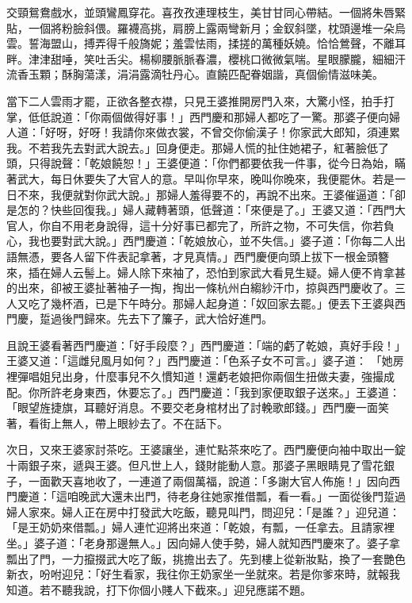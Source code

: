 \begin{showcontents}{}
交頸鴛鴦戲水，並頭鸞鳳穿花。喜孜孜連理枝生，美甘甘同心帶結。一個將朱唇緊貼，一個將粉臉斜偎。羅襪高挑，肩膀上露兩彎新月；金釵斜墜，枕頭邊堆一朵烏雲。誓海盟山，搏弄得千般旖妮；羞雲怯雨，揉搓的萬種妖嬈。恰恰鶯聲，不離耳畔。津津甜唾，笑吐舌尖。楊柳腰脈脈春濃，櫻桃口微微氣喘。星眼朦朧，細細汗流香玉顆；酥胸蕩漾，涓涓露滴牡丹心。直饒匹配眷姻諧，真個偷情滋味美。

當下二人雲雨才罷，正欲各整衣襟，只見王婆推開房門入來，大驚小怪，拍手打掌，低低說道：「你兩個做得好事！」西門慶和那婦人都吃了一驚。那婆子便向婦人道：「好呀，好呀！我請你來做衣裳，不曾交你偷漢子！你家武大郎知，須連累我。不若我先去對武大說去。」回身便走。那婦人慌的扯住她裙子，紅著臉低了頭，只得說聲：「乾娘饒恕！」王婆便道：「你們都要依我一件事，從今日為始，瞞著武大，每日休要失了大官人的意。早叫你早來，晚叫你晚來，我便罷休。若是一日不來，我便就對你武大說。」那婦人羞得要不的，再說不出來。王婆催逼道：「卻是怎的？快些回復我。」婦人藏轉著頭，低聲道：「來便是了。」王婆又道：「西門大官人，你自不用老身說得，這十分好事已都完了，所許之物，不可失信，你若負心，我也要對武大說。」西門慶道：「乾娘放心，並不失信。」婆子道：「你每二人出語無憑，要各人留下件表記拿著，才見真情。」西門慶便向頭上拔下一根金頭簪來，插在婦人云髻上。婦人除下來袖了，恐怕到家武大看見生疑。婦人便不肯拿甚的出來，卻被王婆扯著袖子一掏，掏出一條杭州白縐紗汗巾，掠與西門慶收了。三人又吃了幾杯酒，已是下午時分。那婦人起身道：「奴回家去罷。」便丟下王婆與西門慶，踅過後門歸來。先去下了簾子，武大恰好進門。

且說王婆看著西門慶道：「好手段麼？」西門慶道：「端的虧了乾娘，真好手段！」王婆又道：「這雌兒風月如何？」西門慶道：「色系子女不可言。」婆子道： 「她房裡彈唱姐兒出身，什麼事兒不久慣知道！還虧老娘把你兩個生扭做夫妻，強撮成配。你所許老身東西，休要忘了。」西門慶道：「我到家便取銀子送來。」王婆道：「眼望旌捷旗，耳聽好消息。不要交老身棺材出了討輓歌郎錢。」西門慶一面笑著，看街上無人，帶上眼紗去了。不在話下。

次日，又來王婆家討茶吃。王婆讓坐，連忙點茶來吃了。西門慶便向袖中取出一錠十兩銀子來，遞與王婆。但凡世上人，錢財能動人意。那婆子黑眼睛見了雪花銀子，一面歡天喜地收了，一連道了兩個萬福，說道：「多謝大官人佈施！」因向西門慶道：「這咱晚武大還未出門，待老身往她家推借瓢，看一看。」一面從後門踅過婦人家來。婦人正在房中打發武大吃飯，聽見叫門，問迎兒：「是誰？」迎兒道：「是王奶奶來借瓢。」婦人連忙迎將出來道：「乾娘，有瓢，一任拿去。且請家裡坐。」婆子道：「老身那邊無人。」因向婦人使手勢，婦人就知西門慶來了。婆子拿瓢出了門，一力攛掇武大吃了飯，挑擔出去了。先到樓上從新妝點，換了一套艷色新衣，吩咐迎兒：「好生看家，我往你王奶家坐一坐就來。若是你爹來時，就報我知道。若不聽我說，打下你個小賤人下截來。」迎兒應諾不題。


\end{showcontents}
